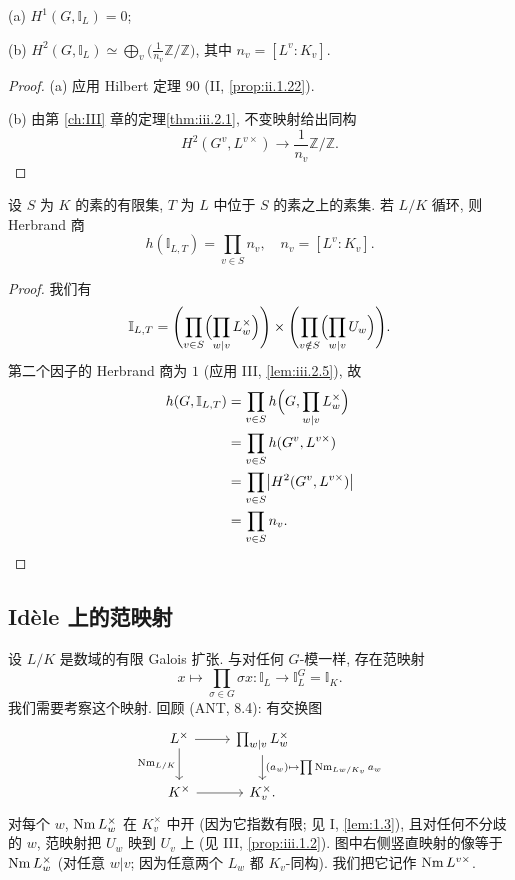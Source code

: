 \begin{corollary}\label{cor:vii.2.6}
(a) $H^{1}(G,\mathbb{I}_{L})=0$;

(b) $H^{2}(G,\mathbb{I}_{L})\simeq\bigoplus_{v}\bigl(\tfrac{1}{n_{v}}\mathbb{Z}/\mathbb{Z}\bigr)$, 其中 $n_v=[L^{v}:K_v]$.
\end{corollary}

\begin{proof}
(a) 应用 Hilbert 定理 90 (II, \ref{prop:ii.1.22}).

(b) 由第 \ref{ch:III} 章的定理\ref{thm:iii.2.1}, 不变映射给出同构
\[
H^{2}(G^{v},L^{v\times})\to\frac{1}{n_{v}}\mathbb{Z}/\mathbb{Z}.
\]
\end{proof}

\begin{proposition}\label{prop:vii.2.7}
设 $S$ 为 $K$ 的素的有限集, $T$ 为 $L$ 中位于 $S$ 的素之上的素集. 若 $L/K$ 循环, 则 Herbrand 商
\[
h(\mathbb{I}_{L,T})=\prod_{v\in S}n_{v},\quad n_{v}=[L^{v}:K_{v}].
\]
\end{proposition}

\begin{proof}
我们有
\[
\mathbb{I}_{L,T}=\Biggl(\prod_{v\in S}\Bigl(\prod_{w|v}L_{w}^{\times}\Bigr)\Biggr)\times\Biggl(\prod_{v\notin S}\Bigl(\prod_{w|v}U_{w}\Bigr)\Biggr).
\]
第二个因子的 Herbrand 商为 $1$ (应用 III, \ref{lem:iii.2.5}), 故
\begin{align*}
h(G,\mathbb{I}_{L,T})&=\prod_{v\in S}h\Bigl(G,\prod_{w|v}L_{w}^{\times}\Bigr)\\
&=\prod_{v\in S}h(G^{v},L^{v\times})\\
&=\prod_{v\in S}\bigl|H^{2}(G^{v},L^{v\times})\bigr|\\
&=\prod_{v\in S}n_{v}.
\end{align*}
\end{proof}

\subsection*{Idèle 上的范映射}

设 $L/K$ 是数域的有限 Galois 扩张. 与对任何 $G$-模一样, 存在范映射
\[
x\mapsto\prod_{\sigma\in G}\sigma x\colon\mathbb{I}_{L}\to\mathbb{I}_{L}^{G}=\mathbb{I}_{K}.
\]
我们需要考察这个映射. 回顾 (ANT, 8.4): 有交换图
\[
\begin{tikzcd}
L^{\times}\ar[r]\ar[d, "\Nm_{L/K}"'] & \prod_{w\mid v}L_{w}^{\times}\ar[d, "(a_{w})\mapsto\prod\Nm_{Lw/K_{v}}a_{w}"]\\
K^{\times}\ar[r] & K_{v}^{\times}.
\end{tikzcd}
\]
对每个 $w$, $\operatorname{Nm} L_w^{\times}$ 在 $K_v^{\times}$ 中开 (因为它指数有限; 见 I, \ref{lem:1.3}), 且对任何不分歧的 $w$, 范映射把 $U_w$ 映到 $U_v$ 上 (见 III, \ref{prop:iii.1.2}). 图中右侧竖直映射的像等于 $\operatorname{Nm} L_w^{\times}$ (对任意 $w|v$; 因为任意两个 $L_w$ 都 $K_v$-同构). 我们把它记作 $\operatorname{Nm} L^{v\times}$.

